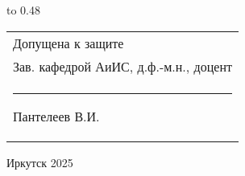 \vspace{0.8cm}

{
	\noindent\hbox to 0.48\textwidth {%
		\mbox{ } \hfil} %
	\begin{tabular}[t]{l}
		Допущена к защите\\
		Зав. кафедрой АиИС, д.ф.-м.н., доцент \\
		\rule{2.7cm}{0.5pt} Пантелеев В.И.
	\end{tabular}		
}

\vspace{0.8cm}

\vfill 
\noindent
\begin{minipage}{\textwidth}
\centering	 Иркутск 2025
\end{minipage}